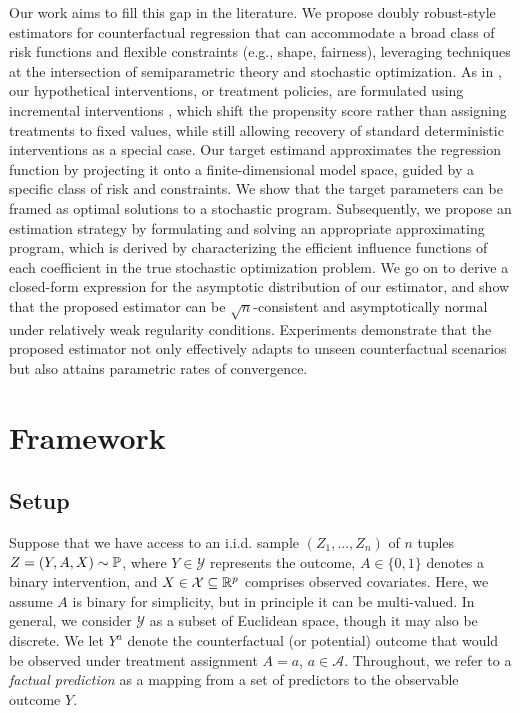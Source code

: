 Our work aims to fill this gap in the literature. We propose doubly robust-style estimators for counterfactual regression that can accommodate a broad class of risk functions and flexible constraints (e.g., shape, fairness), leveraging techniques at the intersection of semiparametric theory and stochastic optimization. As in \citet{mcclean2024nonparametric}, our hypothetical interventions, or treatment policies, are formulated using incremental interventions \citep{kennedy2019nonparametric}, which shift the propensity score rather than assigning treatments to fixed values, while still allowing recovery of standard deterministic interventions as a special case. Our target estimand approximates the regression function by projecting it onto a finite-dimensional model space, guided by a specific class of risk and constraints. We show that the target parameters can be framed as optimal solutions to a stochastic program. Subsequently, we propose an estimation strategy by formulating and solving an appropriate approximating program, which is derived by characterizing the efficient influence functions of each coefficient in the true stochastic optimization problem. We go on to derive a closed-form expression for the asymptotic distribution of our estimator, and show that the proposed estimator can be $\sqrt{n}$-consistent and asymptotically normal under relatively weak regularity conditions. Experiments demonstrate that the proposed estimator not only effectively adapts to unseen counterfactual scenarios but also attains parametric rates of convergence.


\section{Framework}

\subsection{Setup}
Suppose that we have access to an i.i.d. sample $(Z_{1}, ... , Z_{n})$ of $n$ tuples $Z=(Y,A,X) \sim \mathbb{P}$,
where $Y \in \mathcal{Y}$ represents the outcome, $A \in \{0,1\}$ denotes a binary intervention, and $X \in \mathcal{X} \subseteq \mathbb{R}^p$ comprises observed covariates. Here, we assume $A$ is binary for simplicity, but in principle it can be multi-valued. In general, we consider $\mathcal{Y}$ as a subset of Euclidean space, though it may also be discrete. We let $Y^a$ denote the counterfactual (or potential) outcome that would be observed under treatment assignment $A = a$, $a \in \mathcal{A}$. Throughout, we refer to a \emph{factual prediction} as a mapping from a set of predictors to the observable outcome $Y$.

